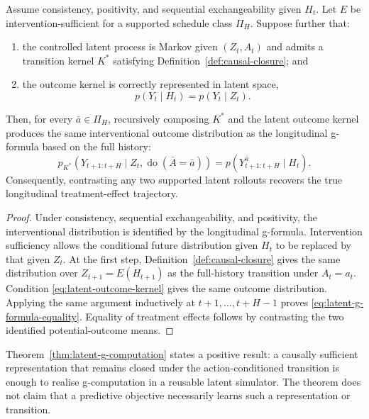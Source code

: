 \begin{theorem}
\label{thm:latent-g-computation}
Assume consistency, positivity, and sequential exchangeability given
$H_t$. Let $E$ be intervention-sufficient for a supported schedule class
$\Pi_H$. Suppose further that:
\begin{enumerate}
    \item the controlled latent process is Markov given $(Z_t,A_t)$ and
    admits a transition kernel $K^*$ satisfying
    Definition~\ref{def:causal-closure}; and
    \item the outcome kernel is correctly represented in latent space,
    \begin{equation}
        p(Y_t\mid H_t)=p(Y_t\mid Z_t).
        \label{eq:latent-outcome-kernel}
    \end{equation}
\end{enumerate}
Then, for every $\bar a\in\Pi_H$, recursively composing $K^*$ and the
latent outcome kernel produces the same interventional outcome
distribution as the longitudinal g-formula based on the full history:
\begin{equation}
    p_{K^*}(Y_{t+1:t+H}\mid Z_t,\operatorname{do}(\bar A=\bar a))
    =p(Y_{t+1:t+H}^{\bar a}\mid H_t).
    \label{eq:latent-g-formula-equality}
\end{equation}
Consequently, contrasting any two supported latent rollouts recovers the
true longitudinal treatment-effect trajectory.
\end{theorem}

\begin{proof}
Under consistency, sequential exchangeability, and positivity, the
interventional distribution is identified by the longitudinal
g-formula. Intervention sufficiency allows the conditional future
distribution given $H_t$ to be replaced by that given $Z_t$. At the
first step, Definition~\ref{def:causal-closure} gives the same
distribution over $Z_{t+1}=E(H_{t+1})$ as the full-history transition
under $A_t=a_t$. Condition \eqref{eq:latent-outcome-kernel} gives the
same outcome distribution. Applying the same argument inductively at
$t+1,\ldots,t+H-1$ proves
\eqref{eq:latent-g-formula-equality}. Equality of treatment effects
follows by contrasting the two identified potential-outcome means.
\end{proof}

Theorem~\ref{thm:latent-g-computation} states a positive result: a
causally sufficient representation that remains closed under the
action-conditioned transition is enough to realise g-computation in a
reusable latent simulator. The theorem does not claim that a predictive
objective necessarily learns such a representation or transition.


